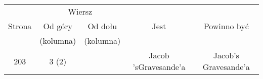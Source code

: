 \documentclass[a4paper,11pt]{article}
\begin{document}
\vspace{\spaceTwo}







\begin{center}
  \begin{tabular}{|c|c|c|c|c|}
    \hline
    & \multicolumn{2}{c|}{Wiersz} & & \\ \cline{2-3}
    Strona & Od góry & Od dołu & Jest & Powinno być \\
    & (kolumna) & (kolumna) & & \\
    \hline
    203 & 3 (2) & & Jacob 'sGravesande'a & Jacob's Gravesande'a \\
    \hline
  \end{tabular}
\end{center}

\vspace{\spaceTwo}






 {}



\end{document}
